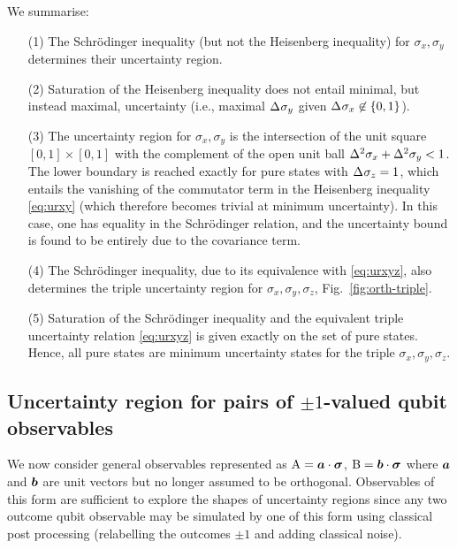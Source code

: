 We summarise:
\begin{enumerate}
  \setlength\itemsep{0pt}
\item[(1)]
  The Schr\"odinger inequality (but not the Heisenberg inequality) for $\sigma_x,\sigma_y$ determines their uncertainty region.
  
\item[(2)]
  Saturation of the Heisenberg inequality does not entail minimal, but instead maximal, uncertainty  (i.e., maximal $\sdev{\sigma_y}$ given $\sdev{\sigma_x}\not\in\{0,1\}$).



\item[(3)]
  The uncertainty region for $\sigma_x,\sigma_y$ is the intersection of the unit square $[0,1]\times[0,1]$ with the complement of the open unit ball $\var{\sigma_x}+\var{\sigma_y}< 1$. The lower boundary is reached exactly for pure states with $\sdev{\sigma_z}=1$, which entails the vanishing of the commutator term in the Heisenberg inequality \eqref{eq:urxy} (which therefore becomes trivial at minimum uncertainty). In this case, one has equality in the Schr\"odinger relation, and the uncertainty bound is found to be entirely due to the covariance term.
  
  \item[(4)] The Schr\"odinger inequality, due to its equivalence with \eqref{eq:urxyz}, also determines the triple uncertainty region for $\sigma_x,\sigma_y,\sigma_z$, Fig.~\ref{fig:orth-triple}. 
  
  \item[(5)]
  Saturation of the Schr\"odinger inequality and  the equivalent triple uncertainty relation \eqref{eq:urxyz} is given exactly on the set of pure states. Hence, all pure states are minimum uncertainty states for the triple $\sigma_x,\sigma_y,\sigma_z$.


\end{enumerate}

\subsection{Uncertainty region for pairs of $\pm 1$-valued qubit observables}
\label{sec:qubit-uncertainty}
We  now consider general observables represented as $\operatorname{A}=\bm{a}\cdot{\boldsymbol\sigma}$, $\operatorname{B}=\bm{b}\cdot{\boldsymbol\sigma}$ where $\bm{a}$ and $\bm{b}$ are unit vectors but no longer assumed to be orthogonal. Observables of this form are sufficient to explore the shapes of uncertainty regions since any two outcome qubit observable may be simulated by one of this form using classical post processing (relabelling the outcomes $\pm1$ and adding classical noise).

